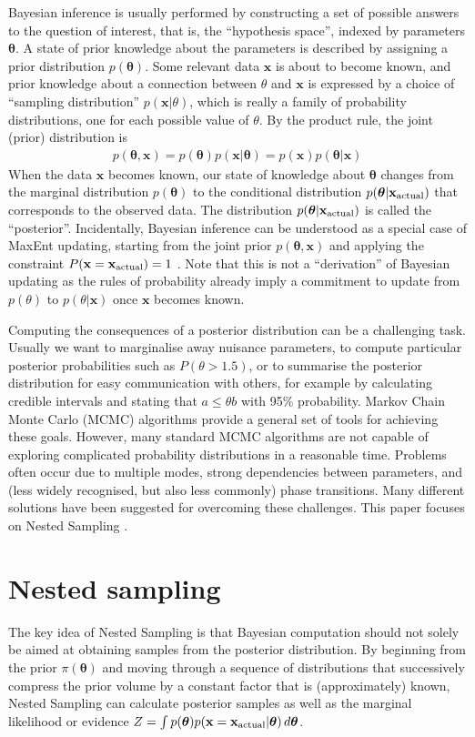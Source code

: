 \documentclass[
  ,final            %
  ]
  {aipproc}
\newcommand{\pars}{\boldsymbol{\theta}}
\newcommand{\data}{\mathbf{x}}
\begin{document}
Bayesian inference is usually performed by
constructing a set of possible answers to the question of
interest, that is, the ``hypothesis space'', indexed by parameters $\pars$.
A state of prior knowledge about the parameters is described by assigning a
prior distribution $p(\pars)$. Some relevant data $\data$ is about to become
known, and prior knowledge about a connection between $\theta$ and $\data$ is
expressed by a choice of ``sampling distribution'' $p(\data | \theta)$, which
is really a family of probability distributions, one for each possible value of
$\theta$. By the product rule, the joint (prior) distribution is
\begin{eqnarray}
p(\pars, \data) = p(\pars) p(\data | \pars) = p(\data)p(\pars | \data)
\end{eqnarray}
When the
data $\data$ becomes known, our state of knowledge about $\pars$ changes
from the marginal distribution $p(\pars)$ to the conditional distribution
$p(\pars | \data_{\rm actual})$
that corresponds to the observed data. The distribution
$p(\pars | \data_{\rm actual})$ is
called the ``posterior''.
Incidentally, Bayesian inference can be understood as a special case of
MaxEnt updating, starting from the joint prior $p(\pars, \data)$ and applying
the constraint $P(\data = \data_{\rm actual}) = 1$ \citep{caticha}. Note that
this is not a ``derivation'' of Bayesian updating as the rules of probability
already imply a commitment to update from $p(\theta)$ to $p(\theta | \data)$
once $\data$ becomes known.

Computing the consequences of a posterior distribution can be a challenging
task. Usually we want to marginalise away nuisance parameters, to compute
particular posterior probabilities such as $P(\theta > 1.5)$, or to summarise
the posterior distribution for easy communication with others, for example by
calculating credible intervals and stating that $a \leq \theta b$ with 95\%
probability.
Markov Chain Monte Carlo (MCMC) algorithms provide a general set of tools
for achieving these goals. However, many standard MCMC algorithms are not
capable of exploring complicated probability distributions in a reasonable time.
Problems often occur due to multiple modes, strong dependencies
between parameters, and (less widely recognised, but also less commonly) phase
transitions. Many different solutions have been suggested for overcoming these
challenges. This paper focuses on Nested Sampling \citep{skilling}.

\section{Nested sampling}
The key idea of Nested Sampling \citep{skilling} is that Bayesian computation
should not solely be aimed at obtaining samples from the posterior distribution.
By beginning from the prior $\pi(\pars)$ and moving through a sequence of
distributions that successively compress the prior volume by a constant factor
that is (approximately) known, Nested Sampling can calculate posterior samples
as well as the marginal likelihood or evidence
$Z = \int p(\pars)p(\data = \data_{\rm actual} | \pars) \, d\pars$.
\end{document}
